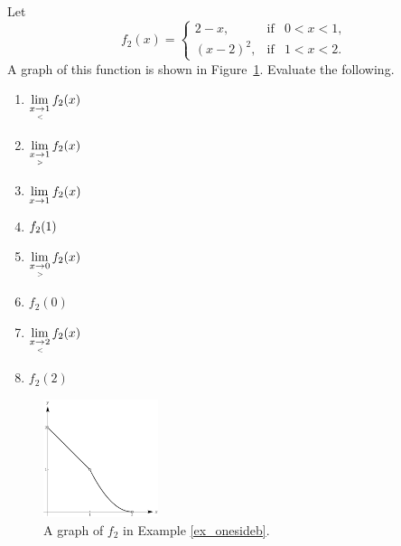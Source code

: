 \begin{example}\label{ex_onesideb}
Let $$f_2(x) = \left\{\begin{array}{lcl} 2-x, & \mbox{if} &  0<x<1, \\ (x-2)^2, & \mbox{if} &  1<x<2. \end{array}\right.$$ A graph of this function is shown in Figure~\ref{fig_lim_13}. Evaluate the following. 
\begin{multicols}{4}
		\begin{enumerate}
			\item		$\displaystyle \lim_{x\underset{<}{\rightarrow}1} f_2(x)$
			\item		$\displaystyle \lim_{x\underset{>}{\rightarrow}1} f_2(x)$
			\item		$\displaystyle \lim_{x\to 1} f_2(x)$
			\item		$\displaystyle f_2(1)$
			\item		$\displaystyle \lim_{x\underset{>}{\rightarrow}0} f_2(x)$
			\item		$f_2(0)$
			\item		$\displaystyle \lim_{x\underset{<}{\rightarrow}2} f_2(x)$
			\item		$f_2(2)$
		\end{enumerate}	
	\end{multicols}
		

\begin{figure}[H]
	\begin{center}
			\includegraphics[width=0.3\textwidth]{fig_lim_13}
	\caption{A graph of $f_2$ in Example \ref{ex_onesideb}. }
	\label{fig_lim_13}
	\end{center}
\end{figure}


\end{example}
